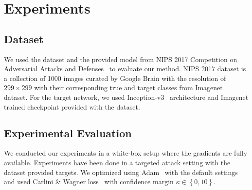 \chapter{Experiments}
\label{chp:4_results}
\section{Dataset}

We used the dataset and the provided model from NIPS 2017 Competition on Adversarial Attacks and Defenses~\cite{kurakin2018adversarial} to evaluate our method. NIPS 2017 dataset is a collection of 1000 images curated by Google Brain with the resolution of \(299 \times 299\) with their corresponding true and target classes from Imagenet~\cite{deng2009imagenet} dataset. For the target network, we used Inception-v3~\cite{szegedy2016rethinking} architecture and Imagenet trained checkpoint provided with the dataset.
\section{Experimental Evaluation}
We conducted our experiments in a white-box setup where the gradients are fully available. Experiments have been done in a targeted attack setting with the dataset provided targets. We optimized using Adam~\cite{kingma2015adam} with the default settings and used Carlini \& Wagner loss~\cite{carlini2017towards} with confidence margin \(\kappa \in \left\{ 0, 10 \right\}\).


